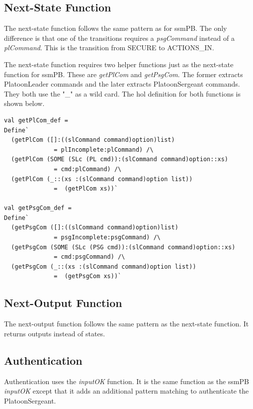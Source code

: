 \documentclass[../../main/main.tex]{subfiles}
\begin{document}
\subsection{Next-State Function}
The next-state function follows the same pattern as for ssmPB.  The only difference is that one of the transitions requires a \textit{psgCommand} instead of a \textit{plCommand}.  This is the transition from SECURE to ACTIONS_IN.

\HOLssmConductORPTheoremsconductORPNSXXdef

The next-state function requires two helper functions just as the next-state function for ssmPB.  These are \textit{getPlCom} and \textit{getPsgCom}.  The former extracts PlatoonLeader commands and the later extracts PlatoonSergeant commands.  They both use the "_" as a wild card.  The \gls{hol} definition for both functions is shown below.
\begin{lstlisting}
val getPlCom_def =
Define`
  (getPlCom ([]:((slCommand command)option)list)
  		      = plIncomplete:plCommand) /\
  (getPlCom (SOME (SLc (PL cmd)):(slCommand command)option::xs)
  		      = cmd:plCommand) /\
  (getPlCom (_::(xs :(slCommand command)option list))
  		      =  (getPlCom xs))`

val getPsgCom_def =
Define`
  (getPsgCom ([]:((slCommand command)option)list)
  		      = psgIncomplete:psgCommand) /\
  (getPsgCom (SOME (SLc (PSG cmd)):(slCommand command)option::xs)
  		      = cmd:psgCommand) /\
  (getPsgCom (_::(xs :(slCommand command)option list))
  		      =  (getPsgCom xs))`
 \end{lstlisting}


\subsection{Next-Output Function}
The next-output function follows the same pattern as the next-state function.  It returns outputs instead of states.

\HOLssmConductORPTheoremsconductORPOutXXdef

\subsection{Authentication}
Authentication uses the \textit{inputOK} function.  It is the same function as the ssmPB \textit{inputOK} except that it adds an additional pattern matching to authenticate the PlatoonSergeant.
\end{document}
